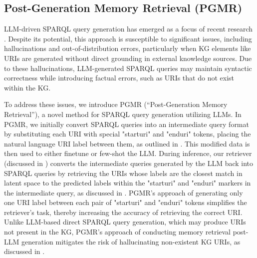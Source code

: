 \subsection{Post-Generation Memory Retrieval (PGMR)}
\label{sec:pgmr}

LLM-driven SPARQL query generation has emerged as a focus of recent research \citep{meyer2024assessing, karou2023, banerjee, qi2024enhancing, Text2SPARQL}. Despite its potential, this approach is susceptible to significant issues, including hallucinations and out-of-distribution errors, particularly when KG elements like URIs are generated without direct grounding in external knowledge sources.
Due to these hallucinations, LLM-generated SPARQL queries may maintain syntactic correctness while introducing factual errors, such as URIs that do not exist within the KG.

To address these issues, we introduce PGMR (“Post-Generation Memory Retrieval”), a novel method for SPARQL query generation utilizing LLMs. In PGMR, we initially convert SPARQL queries into an intermediate query format by substituting each URI with special "starturi" and "enduri" tokens, placing the natural language URI label between them, as outlined in .
This modified data is then used to either finetune or few-shot the LLM.
During inference, our retriever (discussed in ) converts the intermediate queries generated by the LLM back into SPARQL queries by retrieving the URIs whose labels are the closest match in latent space to the predicted labels within the "starturi" and "enduri" markers in the intermediate query, as discussed in .
PGMR’s approach of generating only one URI label between each pair of "starturi" and "enduri" tokens simplifies the retriever’s task, thereby increasing the accuracy of retrieving the correct URI.
Unlike LLM-based direct SPARQL query generation, which may produce URIs not present in the KG, PGMR's approach of conducting memory retrieval post-LLM generation mitigates the risk of hallucinating non-existent KG URIs, as discussed in .


